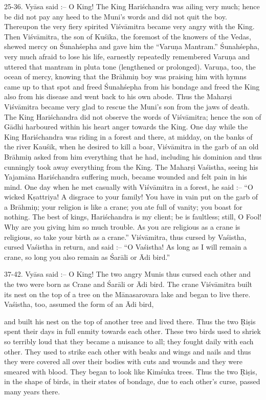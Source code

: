 25-36. Vy\=asa said :-- O King! The King Hari\'schandra was ailing very much; hence be did not pay any heed to the Muni's words and did not quit the boy. Thereupon the very fiery spirited Vi\'sv\=amitra became very angry with the King. Then Vi\'sv\=amitra, the son of Ku\'sika, the foremost of the knowers of the Vedas, shewed mercy on \'Sunah\'sepha and gave him the ``Varu\d{n}a Mantram.'' \'Sunah\'sepha, very much afraid to lose his life, earnestly repeatedly remembered Varu\d{n}a and uttered that mantram in pluta tone (lengthened or prolonged). Varu\d{n}a, too, the ocean of mercy, knowing that the Br\=ahmi\d{n} boy was praising him with hymns came up to that spot and freed \'Sunah\'sepha from his bondage and freed the King also from his disease and went back to his own abode. Thus the Mahar\d{s}i Vi\'sv\=amitra became very glad to rescue the Muni's son from the jaws of death. The King Hari\'schandra did not observe the words of Vi\'sv\=amitra; hence the son of G\=adhi harboured within his heart anger towards the King. One day while the King Hari\'schandra was riding in a forest and there, at midday, on the banks of the river Kau\'sik, when he desired to kill a boar, Vi\'sv\=amitra in the garb of an old Br\=ahmi\d{n} asked from him everything that he had, including his dominion and thus cunningly took away everything from the King. The Mahar\d{s}i Va\'sistha, seeing his Yajam\=ana Hari\'schandra suffering much, became wounded and felt pain in his mind. One day when he met casually with Vi\'sv\=amitra in a forest, he said :-- ``O wicked K\d{s}attriya! A disgrace to your family! You have in vain put on the garb of a Br\=ahmi\d{n}; your religion is like a crane; you ate full of vanity; you boast for nothing. The best of kings, Hari\'schandra is my client; be is faultless; still, O Fool! Why are you giving him so much trouble. As you are religious as a crane is religious, so take your birth as a crane.'' Vi\'sv\=amitra, thus cursed by Va\'sistha, cursed Va\'sistha in return, and said :-- ``O Va\'sistha! As long as I will remain a crane, so long you also remain as \'Sar\=ali or \=Adi bird.''

37-42. Vy\=asa said :-- O King! The two angry Munis thus cursed each other and the two were born as Crane and \'Sar\=ali or \=Adi bird. The crane Vi\'sv\=amitra built its nest on the top of a tree on the M\=anasarovara lake and began to live there. Va\'sistha, too, assumed the form of an \=Adi bird,

and built his nest on the top of another tree and lived there. Thus the two \d{R}i\d{s}is spent their days in full enmity towards each other. These two birds used to shriek so terribly loud that they became a nuisance to all; they fought daily with each other. They used to strike each other with beaks and wings and nails and thus they were covered all over their bodies with cuts and wounds and they were smeared with blood. They began to look like Kim\'suka trees. Thus the two \d{R}i\d{s}is, in the shape of birds, in their states of bondage, due to each other's curse, passed many years there.

